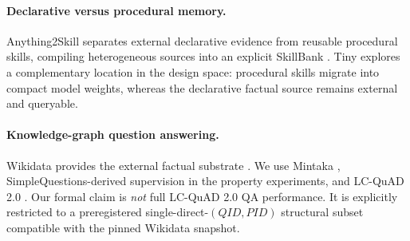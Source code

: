 \documentclass[10pt]{article}
\begin{document}
\paragraph{Declarative versus procedural memory.}
Anything2Skill separates external declarative evidence from reusable procedural skills, compiling heterogeneous sources into an explicit SkillBank \cite{pan2026anything2skill}. Tiny explores a complementary location in the design space: procedural skills migrate into compact model weights, whereas the declarative factual source remains external and queryable.

\paragraph{Knowledge-graph question answering.}
Wikidata provides the external factual substrate \cite{vrandecic2014wikidata}. We use Mintaka \cite{sen2022mintaka}, SimpleQuestions-derived supervision \cite{bordes2015simplequestions} in the property experiments, and LC-QuAD 2.0 \cite{dubey2019lcquad2}. Our formal claim is \emph{not} full LC-QuAD 2.0 QA performance. It is explicitly restricted to a preregistered single-direct-$(QID,PID)$ structural subset compatible with the pinned Wikidata snapshot.
\end{document}
